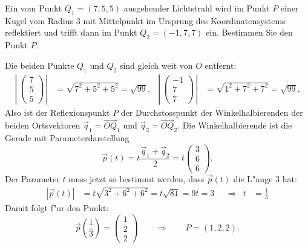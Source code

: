 Ein vom Punkt $Q_1=(7,5,5)$ ausgehender Lichtstrahl wird im Punkt $P$
einer Kugel vom Radius $3$ mit Mittelpunkt im Ursprung des Koordinatensystems
reflektiert und trifft dann im Punkt $Q_2=(-1,7,7)$ ein.
Bestimmen Sie den Punkt $P$.


\begin{loesung}
Die beiden Punkte $Q_1$ und $Q_2$ sind gleich weit von $O$ entfernt:
\begin{align*}
\left|\,\begin{pmatrix} 7\\5\\5 \end{pmatrix} \,\right|
&=\sqrt{7^2+5^2+5^2}=\sqrt{99},
&
\left|\,\begin{pmatrix}-1\\7\\7 \end{pmatrix} \,\right|
&=\sqrt{1^2+7^2+7^2}=\sqrt{99}.
\end{align*}
Also ist der Reflexionspunkt $P$ der Durchstosspunkt der Winkelhalbierenden
der beiden Ortsvektoren $\vec q_1=\overrightarrow{OQ}_1$ und
$\vec q_2=\overrightarrow{OQ}_2$. Die Winkelhalbierende ist
die Gerade mit Parameterdarstellung
\[
\vec p(t)=t\frac{\vec q_1+\vec q_2}2=t\begin{pmatrix} 3\\6\\6 \end{pmatrix}.
\]
Der Parameter $t$ muss jetzt so bestimmt werden, dass $\vec p(t)$ die L"ange
$3$ hat:
\begin{align*}
|\vec p(t)|&=t\sqrt{3^2+6^2+6^2}=t\sqrt{81}=9t=3
&&\Rightarrow&
t&=\frac13
\end{align*}
Damit folgt f"ur den Punkt:
\[
\vec p({\textstyle\frac13})=\begin{pmatrix}1\\2\\2\end{pmatrix}
\qquad\Rightarrow\qquad
P=(1,2,2).
\]
\end{loesung}
